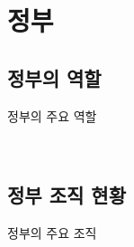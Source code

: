 \documentclass[aspectratio=169,xcolor=dvipsnames,handout]{beamer}
\begin{document}
\section{정부}

\subsection{정부의 역할}

\begin{frame}{정부의 주요 역할}
    \scriptsize
    \begin{table}
        \centering
        \resizebox{.8\textwidth}{!}{\relax
            
        }
        \\
        \raggedright\relax %
        \caption{정부의 주요 역할}
    \end{table}
\end{frame}

\subsection{정부 조직 현황}

\begin{frame}{정부의 주요 조직}
    \scriptsize
    \begin{table}
        \centering
        \resizebox{.8\textwidth}{!}{\relax
            
        }
        \\
        \raggedright\relax %
        \caption{정부의 주요 조직 현황}
    \end{table}
\end{frame}

\end{document}
